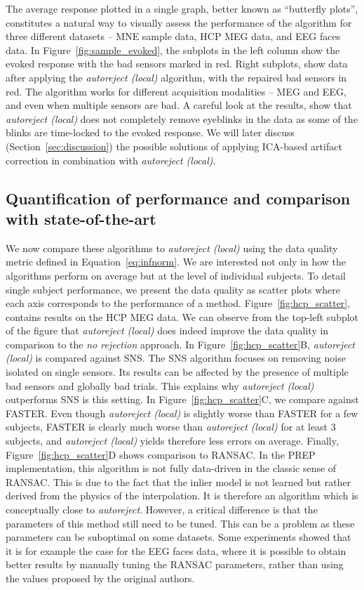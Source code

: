 The average response plotted in a single graph, better known as ``butterfly plots'', constitutes a natural way to visually assess the performance of the algorithm for three different datasets -- MNE sample data, HCP MEG data, and EEG faces data. In Figure~\ref{fig:sample_evoked}, the subplots in the left column show the evoked response with the bad sensors marked in red. Right subplots, show data after applying the \emph{autoreject (local)} algorithm, with the repaired bad sensors in red. The algorithm works for different acquisition modalities -- MEG and EEG, and even when multiple sensors are bad. A careful look at the results, show that \emph{autoreject (local)} does not completely remove eyeblinks in the data as some of the blinks are time-locked to the evoked response. We will later discuss (Section~\ref{sec:discussion}) the possible solutions of applying ICA-based artifact correction in combination with \emph{autoreject (local)}.

\subsection{Quantification of performance and comparison with state-of-the-art}
\label{sec:benchmark_sensors}

We now compare these algorithms to \emph{autoreject (local)} using the data quality metric defined in Equation~\eqref{eq:infnorm}. We are interested not only in how the algorithms perform on average but at the level of individual subjects. To detail single subject performance, we present the data quality as scatter plots where each axis corresponds to the performance of a method. Figure~\ref{fig:hcp_scatter}, contains results on the HCP MEG data. We can observe from the top-left subplot of the figure that \emph{autoreject (local)} does indeed improve the data quality in comparison to the \emph{no rejection} approach. In Figure~\ref{fig:hcp_scatter}B, \emph{autoreject (local)} is compared against SNS. The SNS algorithm focuses on removing noise isolated on single sensors. Its results can be affected by the presence of multiple bad sensors and globally bad trials. This explains why \emph{autoreject (local)} outperforms SNS is this setting. In Figure~\ref{fig:hcp_scatter}C, we compare against FASTER. Even though \emph{autoreject (local)} is slightly worse than FASTER for a few subjects, FASTER is clearly much worse than \emph{autoreject (local)} for at least 3 subjects, and \emph{autoreject (local)} yields therefore less errors on average. Finally, Figure~\ref{fig:hcp_scatter}D shows comparison to RANSAC. In the PREP implementation, this algorithm is not fully data-driven in the classic sense of RANSAC. This is due to the fact that the inlier model is not learned but rather derived from the physics of the interpolation. It is therefore an algorithm which is conceptually close to \emph{autoreject}. However, a critical difference is that the parameters of this method still need to be tuned. This can be a problem as these parameters can be suboptimal on some datasets. Some experiments showed that it is for example the case for the EEG faces data, where it is possible to obtain better results by manually tuning the RANSAC parameters, rather than using the values proposed by the original authors.


